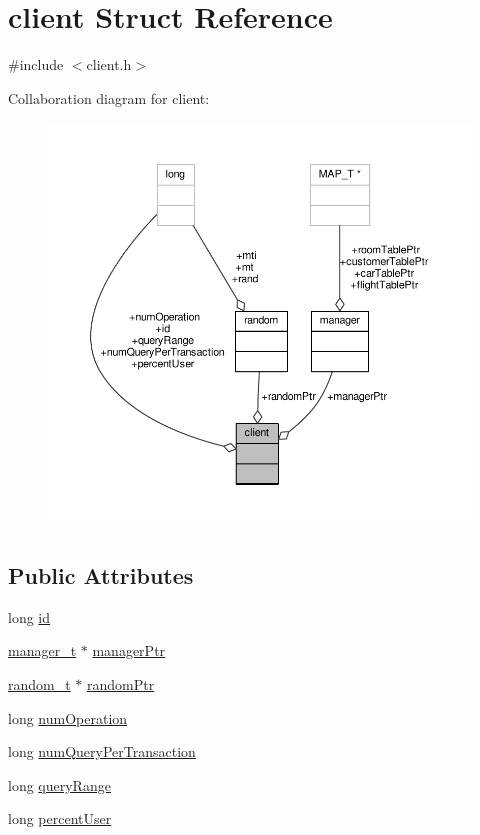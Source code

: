 \hypertarget{structclient}{\section{client Struct Reference}
\label{structclient}
}


{\ttfamily \#include $<$client.\-h$>$}



Collaboration diagram for client\-:
\nopagebreak
\begin{figure}[H]
\begin{center}
\leavevmode
\includegraphics[width=350pt]{structclient__coll__graph}
\end{center}
\end{figure}
\subsection*{Public Attributes}
\begin{DoxyCompactItemize}
\item 
long \hyperlink{structclient_a17b1f9e5542f77e621ec01dde50cf093}{id}
\item 
\hyperlink{manager_8h_a3440d84d7d051c3ea878b9ebf82e724b}{manager\-\_\-t} $\ast$ \hyperlink{structclient_ad1efda1a2b9eed0662ecabd1d26dbd94}{manager\-Ptr}
\item 
\hyperlink{rstm_2rstm-dev_2stamp-0_89_810_2lib_2random_8h_af410e652a1bc8f802b0da971e8b87fad}{random\-\_\-t} $\ast$ \hyperlink{structclient_ad45bd0cb54743277af6562681377c48e}{random\-Ptr}
\item 
long \hyperlink{structclient_aadedfaf2dd96ab91745c50d53882ec00}{num\-Operation}
\item 
long \hyperlink{structclient_a9c193c4ffa92748767798b53793c8ee5}{num\-Query\-Per\-Transaction}
\item 
long \hyperlink{structclient_a1d283b8422bdc13cd4250b5189ecff91}{query\-Range}
\item 
long \hyperlink{structclient_a726a5aef2e634d11e4f58fbd485fd211}{percent\-User}
\end{DoxyCompactItemize}


